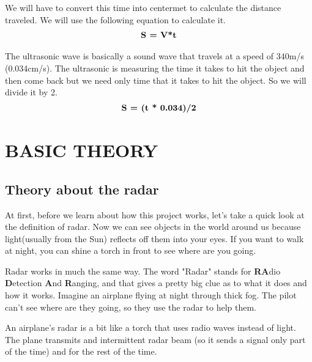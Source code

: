 \documentclass[13pt,a4paper]{report}
\begin{document}
                \vspace{2mm}
                \par We will have to convert this time into centermet to calculate the distance traveled. 
                We will use the following equation to calculate it.
                \begin{align*}
                    \centering
                    \textbf{S = V*t}
                \end{align*}
                \vspace{2mm}
                \par The ultrasonic wave is basically a sound wave that travels at a speed of 340m/s 
                (0.034cm/s). The ultrasonic is measuring the time it takes to hit the object and then 
                come back but we need only time that it takes to hit the object. So we will divide it by 2.
                \begin{align*}
                    \centering
                    \textbf{S = (t * 0.034)/2}
                \end{align*}


    \newpage
    \section{BASIC THEORY}
    \subsection{Theory about the radar}
        At first, before we learn about how this project works, let's take a quick look at the 
        definition of radar. Now we can see objects in the world around us because light(usually 
        from the Sun) reflects off them into your eyes. If you want to walk at night, you can shine 
        a torch in front to see where are you going. \\
        \vspace{1mm}
        \par Radar works in much the same way. The word "Radar" stands for \textbf{RA}dio \textbf{D}etection 
        \textbf{A}nd \textbf{R}anging, and that gives a pretty big clue as to what it does and how 
        it works. Imagine an airplane flying at night through thick fog. The pilot can't see where 
        are they going, so they use the radar to help them. \\
        \vspace{1mm}
        \par An airplane's radar is a bit like a torch that uses radio waves instead of light. The 
        plane transmits and intermittent radar beam (so it sends a signal only part of the time) 
        and for the rest of the time.
\end{document}
